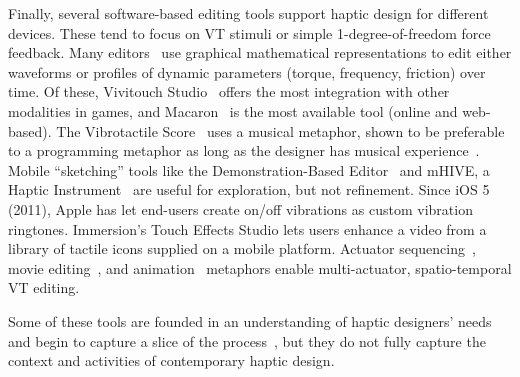 Finally, several software-based editing tools support haptic design for different devices.
These tend to focus on VT stimuli or simple 1-degree-of-freedom force feedback.
Many editors~\citep{Enriquez2003,Swindells2006,Ryu2008,Swindells2014,Meyer2016,Schneider2016macaron}
use graphical mathematical representations to edit either waveforms or profiles of dynamic parameters (torque, frequency, friction) over time.
Of these, Vivitouch Studio~\citep{Swindells2014} offers the most integration with other modalities in games, and Macaron~\citep{Schneider2016macaron} is the most available tool (online and web-based). %
The Vibrotactile Score~\citep{Lee2009} uses a musical metaphor, shown to be preferable to a programming metaphor as long as the designer has musical experience~\citep{Lee2012}. 
Mobile ``sketching'' tools like the Demonstration-Based Editor~\citep{Hong2013} and
mHIVE, a Haptic Instrument~\citep{Schneider2014} are useful for exploration, but not refinement.
Since iOS 5 (2011), Apple has let end-users create on/off vibrations as custom vibration ringtones.
Immersion's Touch Effects Studio lets users enhance a video from a library of tactile icons supplied on a mobile platform.
Actuator sequencing~\citep{Paneels2013}, movie editing~\citep{Kim2009}, and animation~\citep{Schneider2015} metaphors enable multi-actuator, spatio-temporal VT editing.

Some of these tools are founded in an understanding of haptic designers' needs~\citep{Schneider2015,Swindells2014} and begin to capture a slice of the \haxd process~\citep{Schneider2016macaron}, but they do not fully capture the context and activities of contemporary haptic design.



